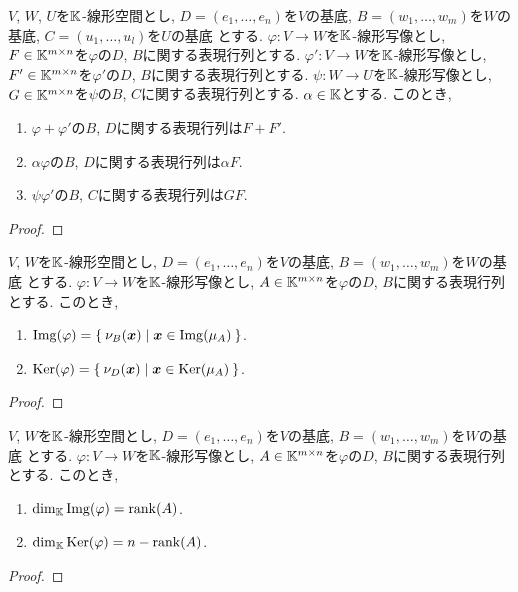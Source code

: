 \begin{prop}
  $V$, $W$, $U$を$\mathbb{K}$-線形空間とし,
  $D=(e_1,\ldots,e_n)$を$V$の基底,
  $B=(w_1,\ldots,w_m)$を$W$の基底,
  $C=(u_1,\ldots,u_l)$を$U$の基底
  とする.
  $\varphi\colon V\to W$を$\mathbb{K}$-線形写像とし,
  $F\in\mathbb{K}^{m\times n}$を$\varphi$の$D$, $B$に関する表現行列とする.
  $\varphi'\colon V\to W$を$\mathbb{K}$-線形写像とし,
  $F'\in\mathbb{K}^{m\times n}$を$\varphi'$の$D$, $B$に関する表現行列とする.
  $\psi\colon W\to U$を$\mathbb{K}$-線形写像とし,
  $G\in\mathbb{K}^{m\times n}$を$\psi$の$B$, $C$に関する表現行列とする.
  $\alpha\in \mathbb{K}$とする.
このとき,
\begin{enumerate}
  \item $\varphi+\varphi'$の$B$, $D$に関する表現行列は$F+F'$.
  \item $\alpha\varphi$の$B$, $D$に関する表現行列は$\alpha F$.
  \item $\psi\varphi'$の$B$, $C$に関する表現行列は$GF$.
\end{enumerate}
\end{prop}
\begin{proof}\end{proof}



\begin{prop}
  $V$, $W$を$\mathbb{K}$-線形空間とし,
  $D=(e_1,\ldots,e_n)$を$V$の基底,
  $B=(w_1,\ldots,w_m)$を$W$の基底
  とする.
  $\varphi\colon V\to W$を$\mathbb{K}$-線形写像とし,
  $A\in\mathbb{K}^{m\times n}$を$\varphi$の$D$, $B$に関する表現行列とする.
  このとき,
\begin{enumerate}
  \item $\operatorname{Img}(\varphi)=\Set{\nu_B(\boldsymbol{x}) |\boldsymbol{x}\in \operatorname{Img}(\mu_A)}$.
  \item $\operatorname{Ker}(\varphi)=\Set{\nu_D(\boldsymbol{x}) |\boldsymbol{x}\in \operatorname{Ker}(\mu_A)}$.
\end{enumerate}
\end{prop}
\begin{proof}\end{proof}

\begin{prop}
  $V$, $W$を$\mathbb{K}$-線形空間とし,
  $D=(e_1,\ldots,e_n)$を$V$の基底,
  $B=(w_1,\ldots,w_m)$を$W$の基底
  とする.
  $\varphi\colon V\to W$を$\mathbb{K}$-線形写像とし,
  $A\in\mathbb{K}^{m\times n}$を$\varphi$の$D$, $B$に関する表現行列とする.
  このとき,
\begin{enumerate}
  \item $\dim_{\mathbb{K}}\operatorname{Img}(\varphi)=\operatorname{rank}(A)$.
  \item $\dim_{\mathbb{K}}\operatorname{Ker}(\varphi)=n-\operatorname{rank}(A)$.
\end{enumerate}
\end{prop}
\begin{proof}\end{proof}

